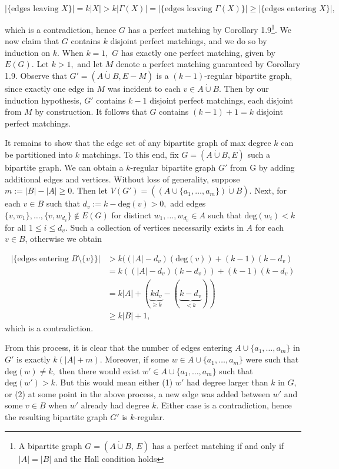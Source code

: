 \documentclass{article}
\begin{document}
$$|\{\text{edges leaving }X\}|=k|X|>k|\Gamma(X)|=|\{\text{edges leaving }\Gamma(X)\}|\geq |\{\text{edges entering }X\}|,$$

which is a contradiction, hence $G$ has a perfect matching by Corollary 1.9\footnote{A bipartite graph $G = (A\dot\cup B,\, E)$
has a perfect matching if and only if $|A| = |B|$ and the Hall condition holds}. We now claim that $G$ contains $k$ disjoint perfect matchings, and we do so by induction on $k.$ When $k=1,$ $G$ has exactly one perfect matching, given by $E(G)$. Let $k>1,$ and let $M$ denote a perfect matching guaranteed by Corollary 1.9. Observe that $G'=(A\dot\cup B, E-M)$ is a $(k-1)$-regular bipartite graph, since exactly one edge in $M$ was incident to each $v\in A\dot\cup B.$ Then by our induction hypothesis, $G'$ contains $k-1$ disjoint perfect matchings, each disjoint from $M$ by construction. It follows that $G$ contains $(k-1)+1=k$ disjoint perfect matchings.

It remains to show that the edge set of any bipartite graph of max degree $k$ can be partitioned into $k$ matchings. To this end, fix $G=(A\dot\cup B,E)$ such a bipartite graph. We can obtain a $k$-regular bipartite graph $G'$ from G by adding additional edges and vertices. Without loss of generality, suppose $m:=|B|-|A|\geq 0$. Then let $V(G')=((A\cup \{a_1,\dots, a_m\})\dot\cup B)$. Next, for each $v\in B$ such that $d_v:=k-\text{deg}(v)>0,$ add edges $\{v,w_1\},\dots,\{v,w_{d_v}\}\notin E(G)$ for distinct $w_1,\dots,w_{d_v}\in A$ such that $\text{deg}(w_i)<k$ for all $1\leq i\leq d_v$. Such a collection of vertices necessarily exists in $A$ for each $v\in B$, otherwise we obtain

\begin{align*}|\{\text{edges entering }B\setminus\{v\}\}|&>k((|A|-d_v)(\text{deg}(v))+(k-1)(k-d_v)\\ &= k((|A|-d_v)(k-d_v))+(k-1)(k-d_v)\\&= k|A|+(\underbrace{kd_v}_{\geq k}-(\underbrace{k-d_v}_{< k})) \\&\geq  k|B|+1,\end{align*}which is a contradiction.

From this process, it is clear that the number of edges entering $A\cup \{a_1,\dots,a_m\}$ in $G'$ is exactly $k(|A|+m).$ Moreover, if some $w\in A\cup \{a_1,\dots,a_m\}$ were such that $\text{deg}(w)\neq k,$ then there would exist $w'\in A\cup \{a_1,\dots,a_m\}$ such that $\text{deg}(w')>k$. But this would mean either (1) $w'$ had degree larger than $k$ in $G$, or (2) at some point in the above process, a new edge was added between $w'$ and some $v\in B$ when $w'$ already had degree $k.$ Either case is a contradiction, hence the resulting bipartite graph $G'$ is $k$-regular.
\end{document}
